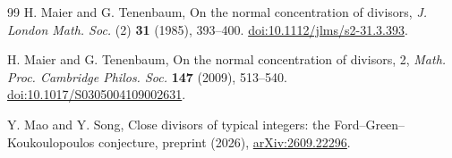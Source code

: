 \documentclass[11pt]{article}
\numberwithin{equation}{section}
\begin{document}
\begin{thebibliography}{99}
H. Maier and G. Tenenbaum, On the normal concentration of divisors,
\emph{J. London Math. Soc.} (2) \textbf{31} (1985), 393--400.
\href{https://doi.org/10.1112/jlms/s2-31.3.393}{doi:10.1112/jlms/s2-31.3.393}.

H. Maier and G. Tenenbaum, On the normal concentration of divisors, 2,
\emph{Math. Proc. Cambridge Philos. Soc.} \textbf{147} (2009), 513--540.
\href{https://doi.org/10.1017/S0305004109002631}{doi:10.1017/S0305004109002631}.

Y. Mao and Y. Song, Close divisors of typical integers:
the Ford--Green--Koukoulopoulos conjecture,
preprint (2026), \href{https://arxiv.org/abs/2609.22296}{arXiv:2609.22296}.

\end{thebibliography}
\end{document}
